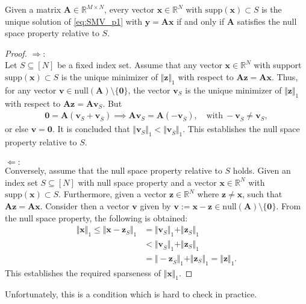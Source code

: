 \begin{theorem}
Given a matrix $\mathbf{A} \in \mathbb{R}^{M \times N}$, every vector $\mathbf{x} \in \mathbb{R}^N$ with $\text{supp}(\mathbf{x}) \subset S$ is the unique solution of \eqref{eq:SMV_p1} with $\mathbf{y} = \mathbf{Ax}$ if and only if $\mathbf{A}$ satisfies the null space property relative to $S$.
\end{theorem}
\begin{proof}
$\Rightarrow:$  \\
Let $S \subseteq [N]$ be a fixed index set. Assume that any vector $\mathbf{x} \in \mathbb{R}^N$ with support $\text{supp}(\mathbf{x})\subset S$ is the unique minimizer of $\Vert \mathbf{z} \Vert_1$ with respect to $\mathbf{Az} = \mathbf{Ax}$. 
Thus, for any vector $\mathbf{v} \in \text{null}(\mathbf{A}) \setminus \{\mathbf{0} \}$, the vector $\mathbf{v}_S$ is the unique minimizer of $\Vert \mathbf{z} \Vert_1$ with respect to $\mathbf{Az} = \mathbf{Av}_S$. 
But 
\begin{align*}
\mathbf{0} = \mathbf{A}(\mathbf{v}_S + \mathbf{v}_{\overline{S}}) \implies \mathbf{Av}_S = \mathbf{A}(-\mathbf{v}_{\overline{S}}), \quad \text{with} \ -\mathbf{v}_{\overline{S}} \neq \mathbf{v}_S,
\end{align*}
or else $\mathbf{v} = \mathbf{0}$. 
It is concluded that $\Vert \mathbf{v}_S \Vert_1 < \Vert \mathbf{v}_{\overline{S}} \Vert_1$. 
This establishes the null space property relative to $S$.
\\ \\
$\Leftarrow:$ \\  
Conversely, assume that the null space property relative to $S$ holds. 
Given an index set $S \subseteq [N]$ with null space property and a vector $\mathbf{x} \in \mathbb{R}^N$ with $\text{supp}(\mathbf{x})\subset S$. Furthermore, given a vector $\mathbf{z} \in \mathbb{R}^N$ where $\mathbf{z} \neq \mathbf{x}$, such that $\mathbf{Az} = \mathbf{Ax}$. Consider then a vector $\mathbf{v}$ given by $\mathbf{v} := \mathbf{x} - \mathbf{z} \in \text{null}(\mathbf{A}) \setminus \{ \mathbf{0} \}$. 
From the null space property, the following is obtained:
\begin{align*}
\Vert \mathbf{x} \Vert_1 \leq \Vert \mathbf{x} - \mathbf{z}_S \Vert_1 &= \Vert \mathbf{v}_S \Vert_1 + \Vert \mathbf{z}_S \Vert_1 \\
&< \Vert \mathbf{v}_{\overline{S}} \Vert_1 + \Vert \mathbf{z}_S \Vert_1 \\
&= \Vert -\mathbf{z}_{\overline{S}} \Vert_1 + \Vert \mathbf{z}_S \Vert_1 = \Vert \mathbf{z} \Vert_1.
\end{align*}
This establishes the required sparseness of $\Vert \mathbf{x} \Vert_1$.
\end{proof}
Unfortunately, this is a condition which is hard to check in practice.


